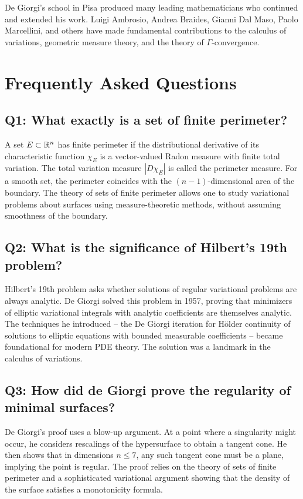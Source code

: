 De Giorgi's school in Pisa produced many leading mathematicians who continued and extended his work. Luigi Ambrosio, Andrea Braides, Gianni Dal Maso, Paolo Marcellini, and others have made fundamental contributions to the calculus of variations, geometric measure theory, and the theory of \(\Gamma\)-convergence.

\section{Frequently Asked Questions}

\subsection*{Q1: What exactly is a set of finite perimeter?}

A set \(E \subset \mathbb{R}^n\) has finite perimeter if the distributional derivative of its characteristic function \(\chi_E\) is a vector-valued Radon measure with finite total variation. The total variation measure \(|D\chi_E|\) is called the perimeter measure. For a smooth set, the perimeter coincides with the \((n-1)\)-dimensional area of the boundary. The theory of sets of finite perimeter allows one to study variational problems about surfaces using measure-theoretic methods, without assuming smoothness of the boundary.

\subsection*{Q2: What is the significance of Hilbert's 19th problem?}

Hilbert's 19th problem asks whether solutions of regular variational problems are always analytic. De Giorgi solved this problem in 1957, proving that minimizers of elliptic variational integrals with analytic coefficients are themselves analytic. The techniques he introduced -- the De Giorgi iteration for H\"older continuity of solutions to elliptic equations with bounded measurable coefficients -- became foundational for modern PDE theory. The solution was a landmark in the calculus of variations.

\subsection*{Q3: How did de Giorgi prove the regularity of minimal surfaces?}

De Giorgi's proof uses a blow-up argument. At a point where a singularity might occur, he considers rescalings of the hypersurface to obtain a tangent cone. He then shows that in dimensions \(n \leq 7\), any such tangent cone must be a plane, implying the point is regular. The proof relies on the theory of sets of finite perimeter and a sophisticated variational argument showing that the density of the surface satisfies a monotonicity formula.

